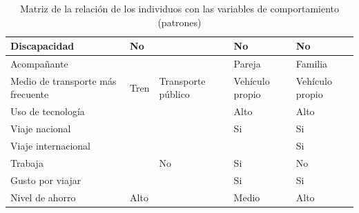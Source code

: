 \begin{table}[H]
\begin{tabular}{|p{10em}|p{7em}|p{7em}|p{7em}|p{8em}|}
        Discapacidad                      & No                                          & \cellcolor{green}{No}                                            & No                                            & No                                            \\ \hline
        Acompañante                       &                                             & \cellcolor{blue}{Familia}                                       & Pareja                                        & Familia                                       \\ \hline
        Medio de transporte más frecuente & Tren                                        & Transporte público                            & Vehículo propio                               & Vehículo propio                               \\ \hline
        Uso de tecnología                 &                                             & \cellcolor{green}{Alto}                                          & Alto                                          & Alto                                          \\ \hline
        Viaje nacional                    & \cellcolor{orange}{Si}                      & \cellcolor{orange}{Si}                                            & Si                                            & Si                                            \\ \hline
        Viaje internacional               & \cellcolor{orange}{Si}                      & \cellcolor{orange}{Si}                                            &                                               & Si                                            \\ \hline
        Trabaja                           & \cellcolor{yellow}{Si}                      & No                                            & Si                                            & No                                            \\ \hline
        Gusto por viajar                  &                                             & \cellcolor{green}{Si}                                            & Si                                            & Si                                            \\ \hline
        Nivel de ahorro                   & Alto                                        & \cellcolor{purple}{Alto}                                           & Medio                                         & Alto                                          \\ \hline
    \end{tabular}
    \caption{Matriz de la relación de los individuos con las variables de comportamiento (patrones)}
    \label{table:relacion-individuos-variables-patrones}
\end{table}
